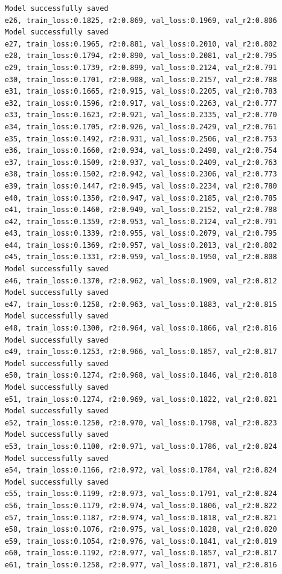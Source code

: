\documentclass[a4paper, 12pt]{article}
\begin{document}
\begin{lstlisting}
	Model successfully saved
	e26, train_loss:0.1825, r2:0.869, val_loss:0.1969, val_r2:0.806
	Model successfully saved
	e27, train_loss:0.1965, r2:0.881, val_loss:0.2010, val_r2:0.802
	e28, train_loss:0.1794, r2:0.890, val_loss:0.2081, val_r2:0.795
	e29, train_loss:0.1739, r2:0.899, val_loss:0.2124, val_r2:0.791
	e30, train_loss:0.1701, r2:0.908, val_loss:0.2157, val_r2:0.788
	e31, train_loss:0.1665, r2:0.915, val_loss:0.2205, val_r2:0.783
	e32, train_loss:0.1596, r2:0.917, val_loss:0.2263, val_r2:0.777
	e33, train_loss:0.1623, r2:0.921, val_loss:0.2335, val_r2:0.770
	e34, train_loss:0.1705, r2:0.926, val_loss:0.2429, val_r2:0.761
	e35, train_loss:0.1492, r2:0.931, val_loss:0.2506, val_r2:0.753
	e36, train_loss:0.1660, r2:0.934, val_loss:0.2498, val_r2:0.754
	e37, train_loss:0.1509, r2:0.937, val_loss:0.2409, val_r2:0.763
	e38, train_loss:0.1502, r2:0.942, val_loss:0.2306, val_r2:0.773
	e39, train_loss:0.1447, r2:0.945, val_loss:0.2234, val_r2:0.780
	e40, train_loss:0.1350, r2:0.947, val_loss:0.2185, val_r2:0.785
	e41, train_loss:0.1460, r2:0.949, val_loss:0.2152, val_r2:0.788
	e42, train_loss:0.1359, r2:0.953, val_loss:0.2124, val_r2:0.791
	e43, train_loss:0.1339, r2:0.955, val_loss:0.2079, val_r2:0.795
	e44, train_loss:0.1369, r2:0.957, val_loss:0.2013, val_r2:0.802
	e45, train_loss:0.1331, r2:0.959, val_loss:0.1950, val_r2:0.808
	Model successfully saved
	e46, train_loss:0.1370, r2:0.962, val_loss:0.1909, val_r2:0.812
	Model successfully saved
	e47, train_loss:0.1258, r2:0.963, val_loss:0.1883, val_r2:0.815
	Model successfully saved
	e48, train_loss:0.1300, r2:0.964, val_loss:0.1866, val_r2:0.816
	Model successfully saved
	e49, train_loss:0.1253, r2:0.966, val_loss:0.1857, val_r2:0.817
	Model successfully saved
	e50, train_loss:0.1274, r2:0.968, val_loss:0.1846, val_r2:0.818
	Model successfully saved
	e51, train_loss:0.1274, r2:0.969, val_loss:0.1822, val_r2:0.821
	Model successfully saved
	e52, train_loss:0.1250, r2:0.970, val_loss:0.1798, val_r2:0.823
	Model successfully saved
	e53, train_loss:0.1100, r2:0.971, val_loss:0.1786, val_r2:0.824
	Model successfully saved
	e54, train_loss:0.1166, r2:0.972, val_loss:0.1784, val_r2:0.824
	Model successfully saved
	e55, train_loss:0.1199, r2:0.973, val_loss:0.1791, val_r2:0.824
	e56, train_loss:0.1179, r2:0.974, val_loss:0.1806, val_r2:0.822
	e57, train_loss:0.1187, r2:0.974, val_loss:0.1818, val_r2:0.821
	e58, train_loss:0.1076, r2:0.975, val_loss:0.1828, val_r2:0.820
	e59, train_loss:0.1054, r2:0.976, val_loss:0.1841, val_r2:0.819
	e60, train_loss:0.1192, r2:0.977, val_loss:0.1857, val_r2:0.817
	e61, train_loss:0.1258, r2:0.977, val_loss:0.1871, val_r2:0.816

\end{lstlisting}
\end{document}

